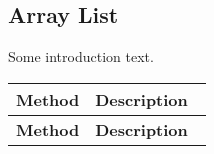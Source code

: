\documentclass[main]{subfiles}
\begin{document}

\subsection{Array List}
\renewcommand{\arraystretch}{1.5}


Some introduction text.

\scriptsize
\begin{longtable}{p{0.4\linewidth} p{0.6\linewidth}}
\hline \textbf{Method} & \textbf{Description}\\ \hline
\endfirsthead

\hline \textbf{Method} & \textbf{Description}\\ \hline\hline
\endhead
\end{longtable}
\todo[inline]{}
\end{document}
